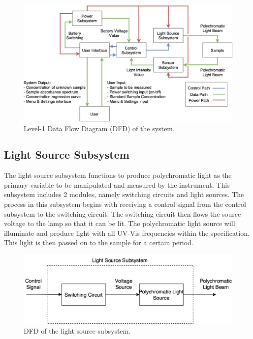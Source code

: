 \documentclass[conference]{IEEEtran}
\begin{document}
    \begin{figure}[htbp]
    \centerline{\includegraphics{system-dfd.png}}
    \caption{Level-1 Data Flow Diagram (DFD) of the system.}
    \label{system-dfd}
    \end{figure}

\subsection{Light Source Subsystem}
The light source subsystem functions to produce polychromatic light as the primary variable to be manipulated and measured by the instrument. This subsystem includes 2 modules, namely switching circuits and light sources. The process in this subsystem begins with receiving a control signal from the control subsystem to the switching circuit. The switching circuit then flows the source voltage to the lamp so that it can be lit. The polychromatic light source will illuminate and produce light with all UV-Vis frequencies within the specification. This light is then passed on to the sample for a certain period.

    \begin{figure}[htbp]
    \centerline{\includegraphics{light-source-dfd.png}}
    \caption{DFD of the light source subsystem.}
    \label{light-source-dfd}
    \end{figure}
\end{document}
